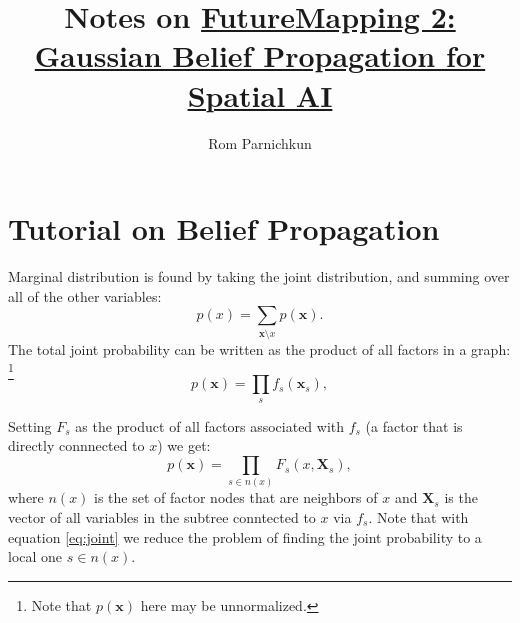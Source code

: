 \documentclass[twocolumn]{article}
\begin{document}
\title{Notes on \href{https://arxiv.org/pdf/1910.14139.pdf}{FutureMapping 2: Gaussian Belief Propagation for Spatial AI}}
\author{Rom Parnichkun}

\maketitle

\section{Tutorial on Belief Propagation}

Marginal distribution is found by taking the joint distribution, and summing over all of the other variables:
\begin{equation}
    p(x) = \sum_{\textbf{x} \setminus x}{p(\textbf{x})}.
    \label{eq:marginal}
\end{equation}
The total joint probability can be written as the product of all factors in a graph: \footnote{Note that $p(\textbf{x})$ here may be unnormalized.}
\begin{equation}
    p(\textbf{x}) = \prod_s{f_s(\textbf{x}_s)},
\end{equation}

Setting $F_s$ as the product of all factors associated with $f_s$ (a factor that is directly connnected to $x$) we get:
\begin{equation}
    p(\textbf{x}) = \prod_{s \in n(x)}{F_s(x, \textbf{X}_s)},
    \label{eq:joint}
\end{equation}
where $n(x)$ is the set of factor nodes that are neighbors of $x$ and $\textbf{X}_s$ is the vector of all variables in the subtree conntected to $x$ via $f_s$. Note that with equation \ref{eq:joint} we reduce the problem of finding the joint probability to a local one $s\in n(x)$.
 
\end{document}
